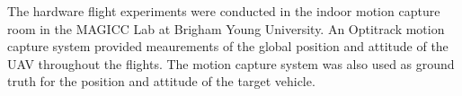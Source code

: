 
The hardware flight experiments were conducted in the indoor motion capture room
in the MAGICC Lab at Brigham Young University. An Optitrack motion capture
system provided meaurements of the global position and attitude of the UAV
throughout the flights. The motion capture system was also used as ground truth
for the position and attitude of the target vehicle.

